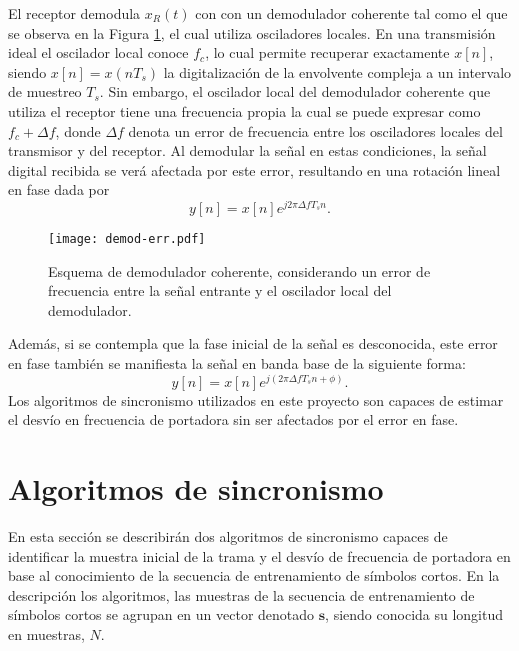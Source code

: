 El receptor demodula $x_R(t)$ con con un demodulador coherente tal como el que se observa en la Figura \ref{fig:demod-err}, el cual utiliza osciladores locales. En una transmisión ideal el oscilador local conoce $f_c$, lo cual permite recuperar exactamente $x[n]$, siendo $x[n]=x(nT_s)$ la digitalización de la envolvente compleja a un intervalo de muestreo $T_s$. Sin embargo, el oscilador local del demodulador coherente que utiliza el receptor tiene una frecuencia propia la cual se puede expresar como $f_c+\Delta f$, donde $\Delta f$ denota un error de frecuencia entre los osciladores locales del transmisor y del receptor. Al demodular la señal en estas condiciones, la señal digital recibida se verá afectada por este error, resultando en una rotación lineal en fase dada por
\begin{equation}
    y[n] = x[n] e^{j2\pi\Delta f T_s n}.
\end{equation}

\begin{figure}[t]
    \centering{}\texttt{[image: demod-err.pdf]}
    \caption{Esquema de demodulador coherente, considerando un error de frecuencia entre la señal entrante y el oscilador local del demodulador.\label{fig:demod-err}}  
\end{figure}

Además, si se contempla que la fase inicial de la señal es desconocida, este error en fase también se manifiesta la señal en banda base de la siguiente forma:
\begin{equation}
    y[n] = x[n] e^{j(2\pi\Delta f T_s n+\phi)}.
\end{equation}
Los algoritmos de sincronismo utilizados en este proyecto son capaces de estimar el desvío en frecuencia de portadora sin ser afectados por el error en fase.


\section{Algoritmos de sincronismo}

En esta sección se describirán dos algoritmos de sincronismo capaces de identificar la muestra inicial de la trama y el desvío de frecuencia de portadora en base al conocimiento de la secuencia de entrenamiento de símbolos cortos. En \color{Green} la descripción los algoritmos, \color{black} las muestras de la secuencia de entrenamiento de símbolos cortos se agrupan en un vector denotado $\mathbf{s}$, siendo conocida su longitud en muestras, $N$. 

